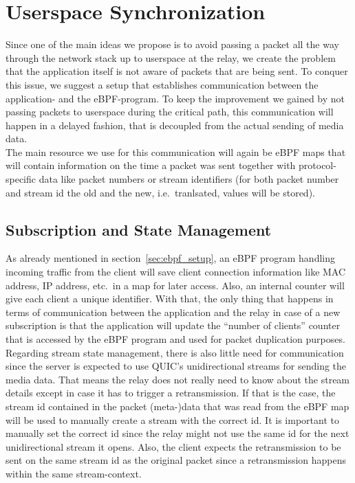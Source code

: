 \section{Userspace Synchronization}\label{sec:userspace_synchronization}

Since one of the main ideas we propose is to avoid passing a packet all the way
through the network stack up to userspace at the relay, we create the problem
that the application itself is not aware of packets that are being sent.
To conquer this issue, we suggest a setup that establishes communication
between the application- and the eBPF-program.
To keep the improvement we gained by not passing packets to userspace during the 
critical path, this communication will happen in a delayed fashion, that is 
decoupled from the actual sending of media data.
\\
The main resource we use for this communication will again be eBPF maps that
will contain information on the time a packet was sent together with protocol-specific 
data like packet numbers or stream identifiers (for both packet number 
and stream id the old and the new, i.e.~tranlsated, values will be stored).



\subsection{Subscription and State Management}
As already mentioned in section~\ref{sec:ebpf_setup}, an eBPF program handling incoming
traffic from the client will save client connection information like MAC address, IP 
address, etc.~in a map for later access.
Also, an internal counter will give each client a unique identifier. %
With that, the only thing that happens in terms of communication between the application 
and the relay in case of a new subscription is that the application will update the ``number 
of clients'' counter that is accessed by the eBPF program and used for packet duplication purposes.
\\
Regarding stream state management, there is also little need for communication since the 
server is expected to use QUIC's unidirectional streams for sending the media data. 
That means the relay does not really need to know about the stream details except in case it 
has to trigger a retransmission.
If that is the case, the stream id contained in the packet (meta-)data that was read from the eBPF map 
will be used to manually create a stream with the correct id.
It is important to manually set the correct id since the relay might not use the same id for the 
next unidirectional stream it opens.
Also, the client expects the retransmission to be sent on the same stream id as the original packet
since a retransmission happens within the same stream-context.

